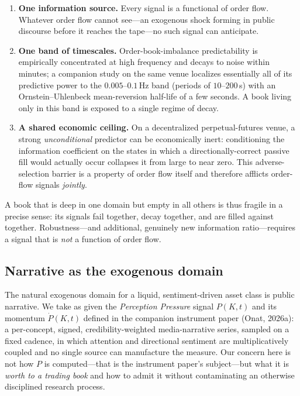 \documentclass[11pt,a4paper]{article}
\theoremstyle{definition}
\theoremstyle{plain}
\begin{document}
\begin{enumerate}
  \item \textbf{One information source.} Every signal is a functional of order flow. Whatever order
        flow cannot see---an exogenous shock forming in public discourse before it reaches the
        tape---no such signal can anticipate.
  \item \textbf{One band of timescales.} Order-book-imbalance predictability is empirically
        concentrated at high frequency and decays to noise within minutes; a companion study on the
        same venue localizes essentially all of its predictive power to the $0.005$--$0.1$\,Hz band
        (periods of $10$--$200$\,s) with an Ornstein--Uhlenbeck mean-reversion half-life of a few
        seconds. A book living only in this band is exposed to a single regime of decay.
  \item \textbf{A shared economic ceiling.} On a decentralized perpetual-futures venue, a strong
        \emph{unconditional} predictor can be economically inert: conditioning the information
        coefficient on the states in which a directionally-correct passive fill would actually occur
        collapses it from large to near zero. This adverse-selection barrier is a property of order
        flow itself and therefore afflicts order-flow signals \emph{jointly}.
\end{enumerate}

A book that is deep in one domain but empty in all others is thus fragile in a precise sense: its
signals fail together, decay together, and are filled against together. Robustness---and additional,
genuinely new information ratio---requires a signal that is \emph{not} a function of order flow.

\subsection{Narrative as the exogenous domain}

The natural exogenous domain for a liquid, sentiment-driven asset class is public narrative. We take
as given the \emph{Perception Pressure} signal $P(K,t)$ and its momentum $\dot P(K,t)$ defined in the
companion instrument paper (Onat, 2026a): a per-concept, signed, credibility-weighted media-narrative
series, sampled on a fixed cadence, in which attention and directional sentiment are multiplicatively
coupled and no single source can manufacture the measure. Our concern here is not how $P$ is
computed---that is the instrument paper's subject---but what it is \emph{worth to a trading book} and
how to admit it without contaminating an otherwise disciplined research process.
\end{document}
